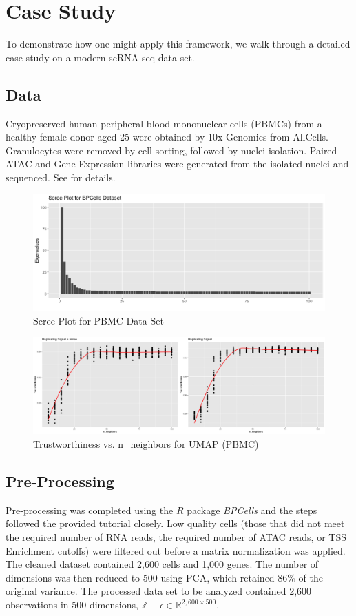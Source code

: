 \documentclass{article}
\begin{document}
\section{Case Study}
To demonstrate how one might apply this framework, we walk through a detailed case study on a modern scRNA-seq data set.

\subsection{Data}
Cryopreserved human peripheral blood mononuclear cells (PBMCs) from a healthy female donor aged 25 were obtained by 10x Genomics from AllCells. Granulocytes were removed by cell sorting, followed by nuclei isolation. Paired ATAC and Gene Expression libraries were generated from the isolated nuclei and sequenced. See \cite{BPCells data} for details.

\renewcommand{\thefigure}{13}
\begin{figure}[t]
\includegraphics[scale=0.43]{BPCells_scree}
\centering
\caption{Scree Plot for PBMC Data Set}
\end{figure}

\renewcommand{\thefigure}{14}
\begin{figure}[b]
\includegraphics[scale=0.22]{trust_plot_BPCells}
\centering
\caption{Trustworthiness vs. n\_neighbors for UMAP (PBMC)}
\end{figure}

\subsection{Pre-Processing}
Pre-processing was completed using the $R$ package \textit{BPCells} and the steps followed the provided tutorial \cite{BPCells tutorial} closely. Low quality cells (those that did not meet the required number of RNA reads, the required number of ATAC reads, or TSS Enrichment cutoffs) were filtered out before a matrix normalization was applied. The cleaned dataset contained 2,600 cells and 1,000 genes. The number of dimensions was then reduced to 500 using PCA, which retained 86\% of the original variance. The processed data set to be analyzed contained 2,600 observations in 500 dimensions, $\mathbb{Z + \epsilon} \in \mathbb{R}^{2,600 \times 500}$.
\end{document}
